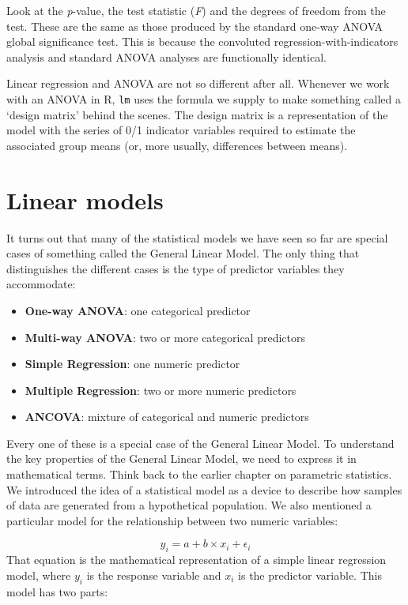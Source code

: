 \documentclass[
]{book}
\providecommand{\tightlist}{%
  \setlength{\itemsep}{0pt}\setlength{\parskip}{0pt}}
\begin{document}
Look at the \emph{p}-value, the test statistic (\emph{F}) and the degrees of freedom from the test. These are the same as those produced by the standard one-way ANOVA global significance test. This is because the convoluted regression-with-indicators analysis and standard ANOVA analyses are functionally identical.

Linear regression and ANOVA are not so different after all. Whenever we work with an ANOVA in R, \texttt{lm} uses the formula we supply to make something called a `design matrix' behind the scenes. The design matrix is a representation of the model with the series of 0/1 indicator variables required to estimate the associated group means (or, more usually, differences between means).

\hypertarget{linear-models}{%
\section{Linear models}\label{linear-models}}

It turns out that many of the statistical models we have seen so far are special cases of something called the General Linear Model. The only thing that distinguishes the different cases is the type of predictor variables they accommodate:

\begin{itemize}
\tightlist
\item
  \textbf{One-way ANOVA}: one categorical predictor
\item
  \textbf{Multi-way ANOVA}: two or more categorical predictors
\item
  \textbf{Simple Regression}: one numeric predictor
\item
  \textbf{Multiple Regression}: two or more numeric predictors
\item
  \textbf{ANCOVA}: mixture of categorical and numeric predictors
\end{itemize}

Every one of these is a special case of the General Linear Model. To understand the key properties of the General Linear Model, we need to express it in mathematical terms. Think back to the earlier chapter on parametric statistics. We introduced the idea of a statistical model as a device to describe how samples of data are generated from a hypothetical population. We also mentioned a particular model for the relationship between two numeric variables:

\[y_i = a + b \times x_i + \epsilon_i\]
That equation is the mathematical representation of a simple linear regression model, where \(y_i\) is the response variable and \(x_i\) is the predictor variable. This model has two parts:
\end{document}
